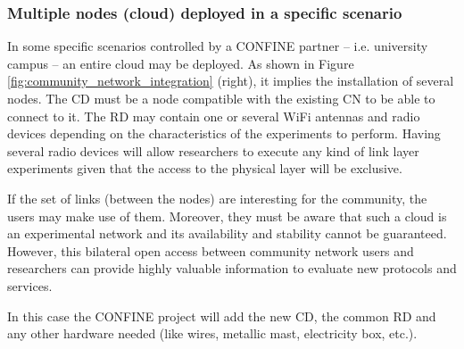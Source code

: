 \documentclass[conference]{IEEEtran}
\begin{document}
\subsubsection{Multiple nodes (cloud) deployed in a specific scenario}

In some specific scenarios controlled by a CONFINE partner -- i.e. university campus -- an entire cloud may be 
deployed. As shown in Figure \ref{fig:community_network_integration} (right), it implies the installation of several 
nodes. The CD must be a node compatible with the existing CN to be able to connect to it. 
The RD may contain one or several WiFi antennas and radio devices depending on the characteristics of the experiments to perform. 
Having several radio devices will allow researchers to execute any kind of link layer experiments given that
the access to the physical layer will be exclusive.

If the set of links (between the nodes) are interesting for the community, the users may make use of them.
Moreover, they must be aware that such a cloud is an experimental network and its availability and stability cannot
be guaranteed. However, this bilateral open access between community network users and researchers can provide
highly valuable information to evaluate new protocols and services.

In this case the CONFINE project will add the new CD, the common RD and any other hardware needed (like wires,
metallic mast, electricity box, etc.).







\end{document}
